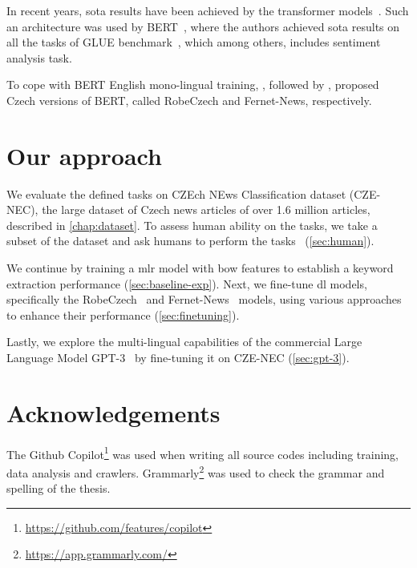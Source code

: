 In recent years, \ac{sota} results have been achieved by the transformer models~\parencite{vaswaniAttentionAllYou2017d}.
Such an architecture was used by BERT~\parencite{devlinBERTPretrainingDeep2019a}, where the authors achieved \ac{sota} results on
all the tasks of GLUE benchmark~\parencite{wangGLUEMultiTaskBenchmark2018}, which among others, includes 
sentiment analysis task.

To cope with BERT English mono-lingual training, \textcite{strakaRobeCzechCzechRoBERTa2021}, followed by \textcite{leheckaComparisonCzechTransformers2021},
proposed Czech versions of BERT, called RobeCzech and Fernet-News, respectively.


\section*{Our approach}
We evaluate the defined tasks on CZEch NEws Classification dataset (CZE-NEC), 
the large dataset of Czech news articles of over 1.6 million articles, described in \autoref{chap:dataset}.
To assess human ability on the tasks, we take a subset of the dataset and ask humans to perform the tasks
~(\autoref{sec:human}).

We continue by training a \acl{mlr} model with \acl{bow} features to establish a keyword extraction performance (\autoref{sec:baseline-exp}).
Next, we fine-tune \ac{dl} models,
specifically the RobeCzech~\parencite{strakaRobeCzechCzechRoBERTa2021}
and Fernet-News~\parencite{leheckaComparisonCzechTransformers2021} models,
using various approaches to enhance their performance (\autoref{sec:finetuning}).

Lastly, we explore the multi-lingual capabilities of the commercial Large Language Model GPT-3~\parencite{brownLanguageModelsAre2020b}
by fine-tuning it on CZE-NEC (\autoref{sec:gpt-3}).

\section*{Acknowledgements}
The Github Copilot\footnote{\url{https://github.com/features/copilot}}
was used when writing all source codes including training, data analysis and crawlers.
Grammarly\footnote{\url{https://app.grammarly.com/}} was used to check the grammar and spelling of the thesis.
